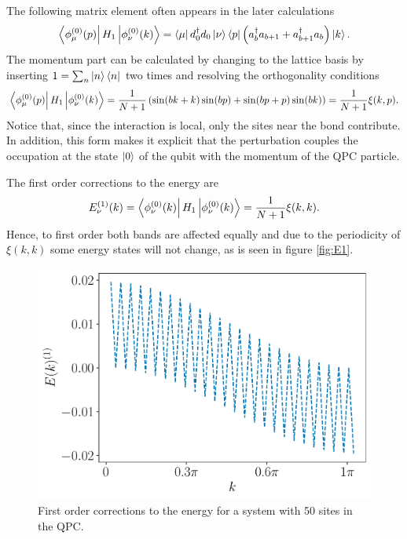 \documentclass{article}
\begin{document}
The following matrix element often appears in the later calculations
\begin{align}
    \bra{\phi^{(0)}_\mu (p)}H_1 \ket{\phi^{(0)}_\nu (k)} = \bra{\mu}d^\dagger_0 d_0 \ket{\nu} \bra{p}\left( a_{b}^{\dagger}a_{b+1} + a^{\dagger}_{b+1}a_{b}  \right) \ket{k}.
\end{align}
The momentum part can be calculated by changing to the lattice basis by inserting $1 = \sum_{n} \ket{n}\bra{n}$ two times and resolving the orthogonality conditions
\begin{align}
    \bra{\phi^{(0)}_\mu (p)}H_1 \ket{\phi^{(0)}_\nu (k)} = \frac{1}{N+1} \left(  \sin(bk+k)\sin(bp)+ \sin(bp+p)\sin(bk)\right) = \frac{1}{N+1} \xi(k,p).
\end{align}
Notice that, since the interaction is local, only the sites near the bond contribute. 
In addition, this form makes it explicit that the perturbation couples the occupation 
at the state $\ket{0}$ of the qubit with the momentum of the QPC particle.

The first order corrections to the energy are
\begin{align}
    E_{\nu}^{(1)}(k) = \bra{\phi^{(0)}_\nu (k)}H_1 \ket{\phi^{(0)}_\nu (k)} = \frac{1}{N+1} \xi(k,k).
\end{align}
Hence, to first order both bands are affected equally and due to the periodicity of 
$\xi(k,k)$ some energy states will not change, as is seen in figure \ref{fig:E1}.

\begin{figure}[h!]
    \centering
        \includegraphics[width=0.5\linewidth]{figures/report_07_2025/E1_corr=50_Omega=0.5_t=0.4.pdf}
        \caption{First order corrections to the energy for a system with 50 sites in the QPC.}
\end{figure}\label{fig:E1}
\end{document}
